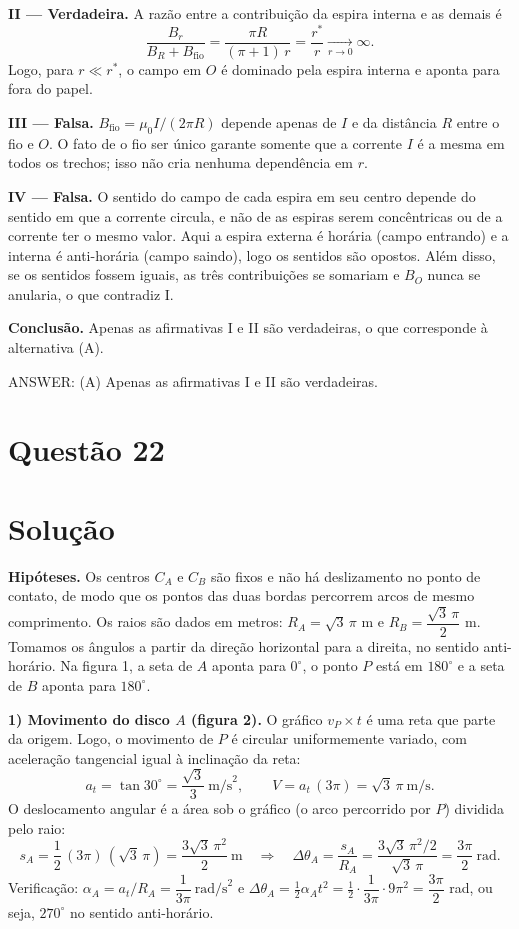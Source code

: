 \documentclass{article}%
\begin{document}
\textbf{II --- Verdadeira.} A razão entre a contribuição da espira interna e as demais é
\[
\frac{B_r}{B_R+B_{\text{fio}}}=\frac{\pi R}{(\pi+1)\,r}=\frac{r^{*}}{r}\xrightarrow[r\to0]{}\infty .
\]
Logo, para $r\ll r^{*}$, o campo em $O$ é dominado pela espira interna e aponta para fora do papel.

\textbf{III --- Falsa.} $B_{\text{fio}}=\mu_0 I/(2\pi R)$ depende apenas de $I$ e da distância $R$ entre o fio e $O$. O fato de o fio ser único garante somente que a corrente $I$ é a mesma em todos os trechos; isso não cria nenhuma dependência em $r$.

\textbf{IV --- Falsa.} O sentido do campo de cada espira em seu centro depende do sentido em que a corrente circula, e não de as espiras serem concêntricas ou de a corrente ter o mesmo valor. Aqui a espira externa é horária (campo entrando) e a interna é anti-horária (campo saindo), logo os sentidos são opostos. Além disso, se os sentidos fossem iguais, as três contribuições se somariam e $B_O$ nunca se anularia, o que contradiz I.

\textbf{Conclusão.} Apenas as afirmativas I e II são verdadeiras, o que corresponde à alternativa (A).

ANSWER: (A) Apenas as afirmativas I e II são verdadeiras.%
\newpage%
\section*{Questão 22}

\section*{Solução}

\textbf{Hipóteses.} Os centros $C_A$ e $C_B$ são fixos e não há deslizamento no ponto de contato, de modo que os pontos das duas bordas percorrem arcos de mesmo comprimento. Os raios são dados em metros: $R_A=\sqrt{3}\,\pi$ m e $R_B=\dfrac{\sqrt{3}\,\pi}{2}$ m. Tomamos os ângulos a partir da direção horizontal para a direita, no sentido anti-horário. Na figura 1, a seta de $A$ aponta para $0^\circ$, o ponto $P$ está em $180^\circ$ e a seta de $B$ aponta para $180^\circ$.

\textbf{1) Movimento do disco $A$ (figura 2).} O gráfico $v_P\times t$ é uma reta que parte da origem. Logo, o movimento de $P$ é circular uniformemente variado, com aceleração tangencial igual à inclinação da reta:
\[
a_t=\tan 30^\circ=\frac{\sqrt3}{3}\ \text{m/s}^2,\qquad V=a_t\,(3\pi)=\sqrt3\,\pi\ \text{m/s}.
\]
O deslocamento angular é a área sob o gráfico (o arco percorrido por $P$) dividida pelo raio:
\[
s_A=\frac{1}{2}\,(3\pi)\,(\sqrt3\,\pi)=\frac{3\sqrt3\,\pi^2}{2}\ \text{m}
\quad\Rightarrow\quad
\Delta\theta_A=\frac{s_A}{R_A}=\frac{3\sqrt3\,\pi^2/2}{\sqrt3\,\pi}=\frac{3\pi}{2}\ \text{rad}.
\]
Verificação: $\alpha_A=a_t/R_A=\dfrac{1}{3\pi}\ \text{rad/s}^2$ e $\Delta\theta_A=\tfrac12\alpha_A t^2=\tfrac12\cdot\dfrac{1}{3\pi}\cdot 9\pi^2=\dfrac{3\pi}{2}$ rad, ou seja, $270^\circ$ no sentido anti-horário.
\end{document}
